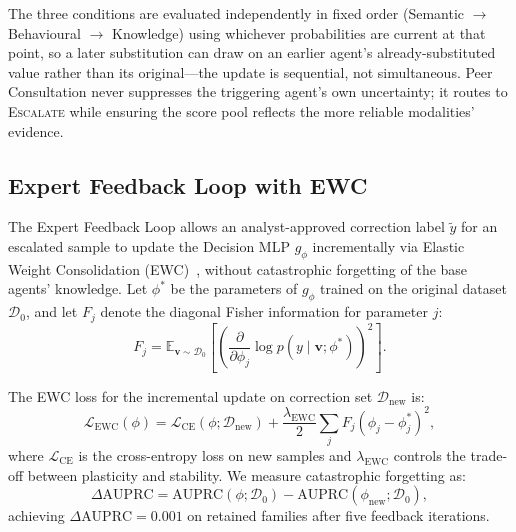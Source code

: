 \documentclass[journal]{IEEEtran}
\newcommand{\E}{\mathbb{E}}
\begin{document}
The three conditions are evaluated independently in fixed order
(Semantic $\to$ Behavioural $\to$ Knowledge) using whichever
probabilities are current at that point, so a later substitution can
draw on an earlier agent's already-substituted value rather than its
original---the update is sequential, not simultaneous. Peer Consultation
never suppresses the triggering agent's own uncertainty; it routes to
\textsc{Escalate} while ensuring the score pool reflects the more
reliable modalities' evidence.

\subsection{Expert Feedback Loop with EWC}

The Expert Feedback Loop allows an analyst-approved correction label
$\tilde{y}$ for an escalated sample to update the Decision MLP $g_\phi$
incrementally via Elastic Weight Consolidation
(EWC)~\cite{kirkpatrick_ewc_2017}, without catastrophic forgetting of the
base agents' knowledge.
Let $\phi^*$ be the parameters of $g_\phi$ trained on the original dataset
$\mathcal{D}_0$, and let $F_j$ denote the diagonal Fisher information for
parameter $j$:
\begin{equation}\label{eq:fisher}
  F_j = \E_{\mathbf{v} \sim \mathcal{D}_0}\!\left[
    \left(\frac{\partial}{\partial \phi_j}
    \log p(y \mid \mathbf{v}; \phi^*)\right)^2
  \right].
\end{equation}

The EWC loss for the incremental update on correction set
$\mathcal{D}_{\text{new}}$ is:
\begin{equation}\label{eq:ewc}
  \mathcal{L}_{\text{EWC}}(\phi) =
    \mathcal{L}_{\text{CE}}(\phi; \mathcal{D}_{\text{new}})
    + \frac{\lambda_{\text{EWC}}}{2}
      \sum_{j} F_j \left(\phi_j - \phi^*_j\right)^2,
\end{equation}
where $\mathcal{L}_{\text{CE}}$ is the cross-entropy loss on new samples and
$\lambda_{\text{EWC}}$ controls the trade-off between plasticity and
stability. We measure catastrophic forgetting as:
\begin{equation}\label{eq:forgetting}
  \Delta\text{AUPRC} =
    \text{AUPRC}(\phi; \mathcal{D}_0) -
    \text{AUPRC}(\phi_{\text{new}}; \mathcal{D}_0),
\end{equation}
achieving $\Delta\text{AUPRC} = 0.001$ on retained families after five
feedback iterations.

\end{document}
